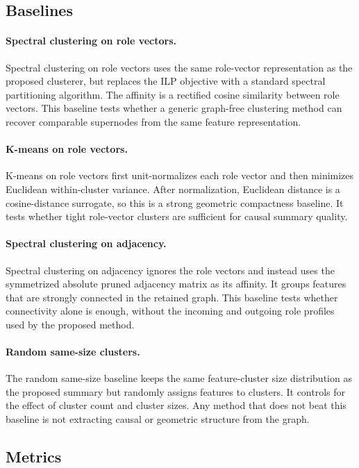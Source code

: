 \documentclass[../main.tex]{subfiles}
\begin{document}
\subsection{Baselines}

\paragraph{Spectral clustering on role vectors.}
Spectral clustering on role vectors uses the same role-vector representation as
the proposed clusterer, but replaces the ILP objective with a standard spectral
partitioning algorithm. The affinity is a rectified cosine similarity between
role vectors. This baseline tests whether a generic graph-free clustering method
can recover comparable supernodes from the same feature representation.

\paragraph{K-means on role vectors.}
K-means on role vectors first unit-normalizes each role vector and then minimizes
Euclidean within-cluster variance. After normalization, Euclidean distance is a
cosine-distance surrogate, so this is a strong geometric compactness baseline.
It tests whether tight role-vector clusters are sufficient for causal summary
quality.

\paragraph{Spectral clustering on adjacency.}
Spectral clustering on adjacency ignores the role vectors and instead uses the
symmetrized absolute pruned adjacency matrix as its affinity. It groups features
that are strongly connected in the retained graph. This baseline tests whether
connectivity alone is enough, without the incoming and outgoing role profiles
used by the proposed method.

\paragraph{Random same-size clusters.}
The random same-size baseline keeps the same feature-cluster size distribution
as the proposed summary but randomly assigns features to clusters. It controls
for the effect of cluster count and cluster sizes. Any method that does not beat
this baseline is not extracting causal or geometric structure from the graph.

\subsection{Metrics}
\end{document}

